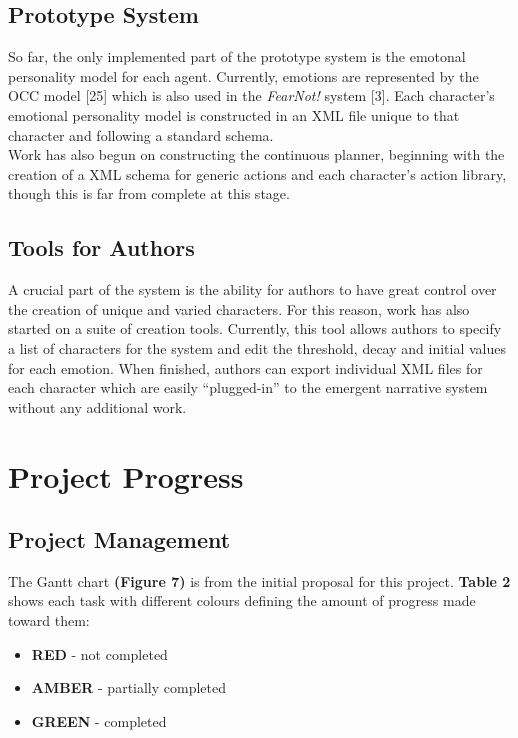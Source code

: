 \documentclass{sig-alternate-05-2015}
\begin{document}
\subsection{Prototype System}

\noindent So far, the only implemented part of the prototype system is the emotonal personality model for each agent. Currently, emotions are represented by the OCC model [25] which is also used in the \textit{FearNot!} system [3]. Each character's emotional personality model is constructed in an XML file unique to that character and following a standard schema.\\

Work has also begun on constructing the continuous planner, beginning with the creation of a XML schema for generic actions and each character's action library, though this is far from complete at this stage.

\subsection{Tools for Authors}

\noindent A crucial part of the system is the ability for authors to have great control over the creation of unique and varied characters. For this reason, work has also started on a suite of creation tools. Currently, this tool allows authors to specify a list of characters for the system and edit the threshold, decay and initial values for each emotion. When finished, authors can export individual XML files for each character which are easily ``plugged-in'' to the emergent narrative system without any additional work.

\section{Project Progress}
\subsection{Project Management}

\noindent The Gantt chart \textbf{(Figure 7)} is from the initial proposal for this project. \textbf{Table 2} shows each task with different colours
defining the amount of progress made toward them:
\begin{itemize}
	\item \color{red} \textbf{RED} \color{black} - not completed
	\item \color{orange} \textbf{AMBER} \color{black} - partially completed
	\item \color{green} \textbf{GREEN} \color{black} - completed
\end{itemize}
\end{document}
